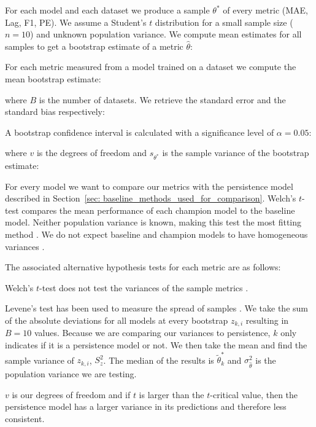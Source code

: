 For each model and each dataset we produce a sample $\theta^*$ of every metric (MAE, Lag, F1, PE). We assume a Student's $t$ distribution for a small sample size ($n=10$) and unknown population variance. We compute mean estimates for all samples to get a bootstrap estimate of a metric $\hat{\theta}$:

For each metric measured from a model trained on a dataset we compute the mean bootstrap estimate:

where $B$ is the number of datasets. We retrieve the standard error and the standard bias respectively:

A bootstrap confidence interval is calculated with a significance level of $\alpha = 0.05$:

where $v$ is the degrees of freedom and $s_{\theta^*}$ is the sample variance of the bootstrap estimate:


 For every model we want to compare our metrics with the persistence model described in Section~\ref{sec: baseline_methods_used_for_comparison}. Welch's $t$-test compares the mean performance of each champion model to the baseline model. Neither population variance is known, making this test the most fitting method \cite{delacre2017welch}. We do not expect 
 baseline and champion models to have homogeneous variances \cite{welch1947generalization}.
 
The associated alternative hypothesis tests for each metric are as follows:

Welch's $t$-test does not test the variances of the sample metrics \cite{welch1947generalization}. 

Levene's test has been used to measure the spread of samples \cite{zhou2023homogeneity,wang2017comparing}. We take the sum of the absolute deviations for all models at every bootstrap $z_{k,i}$ resulting in $B=10$ values.
Because we are comparing our variances to persistence, $k$ only indicates if it is a persistence model or not. We then take the mean and find the sample variance of $z_{k,i}$, $S_z^2$.
The median of the results is $\tilde{\theta}^*_k$ and $\sigma_{\hat{\theta}}^2$ is the population variance we are testing.

$v$ is our degrees of freedom and if $t$ is  larger than the $t$-critical value, then the persistence model has a larger variance in its predictions
and therefore less consistent.
